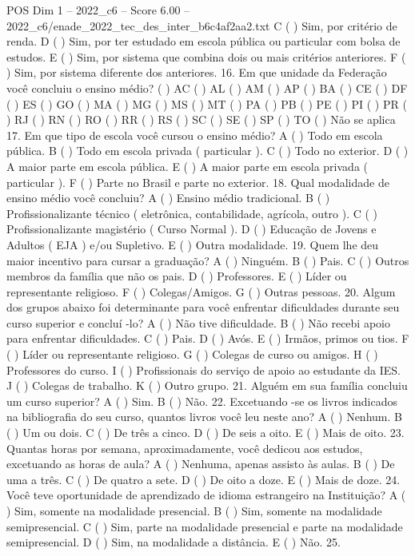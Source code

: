 \begin{textsample}{POS Dim 1 – 2022\_c6 – Score 6.00 – 2022\_c6/enade\_2022\_tec\_des\_inter\_b6c4af2aa2.txt}
C ( ) Sim, por critério de renda.
D ( ) Sim, por ter estudado em escola pública ou particular com bolsa de estudos.
E ( ) Sim, por sistema que combina dois ou mais critérios anteriores.
F ( ) Sim, por sistema diferente dos anteriores. 16.
Em que unidade da Federação você concluiu o ensino médio? ( ) AC ( ) AL ( ) AM ( ) AP ( ) BA ( ) CE ( ) DF ( ) ES ( ) GO ( ) MA ( ) MG ( ) MS ( ) MT ( ) PA ( ) PB ( ) PE ( ) PI ( ) PR ( ) RJ ( ) RN ( ) RO ( ) RR ( ) RS ( ) SC ( ) SE ( ) SP ( ) TO ( ) Não se aplica 17.
Em que tipo de escola você cursou o ensino médio?
A ( ) Todo em escola pública.
B ( ) Todo em escola privada ( particular ).
C ( ) Todo no exterior.
D ( ) A maior parte em escola pública.
E ( ) A maior parte em escola privada ( particular ).
F ( ) Parte no Brasil e parte no exterior. 18.
Qual modalidade de ensino médio você concluiu?
A ( ) Ensino médio tradicional.
B ( ) Profissionalizante técnico ( eletrônica, contabilidade, agrícola, outro ).
C ( ) Profissionalizante magistério ( Curso Normal ).
D ( ) Educação de Jovens e Adultos ( EJA ) e/ou Supletivo.
E ( ) Outra modalidade. 19.
Quem lhe deu maior incentivo para cursar a graduação?
A ( ) Ninguém.
B ( ) Pais.
C ( ) Outros membros da família que não os pais.
D ( ) Professores.
E ( ) Líder ou representante religioso.
F ( ) Colegas/Amigos.
G ( ) Outras pessoas. 20.
Algum dos grupos abaixo foi determinante para você enfrentar dificuldades durante seu curso superior e concluí -lo?
A ( ) Não tive dificuldade.
B ( ) Não recebi apoio para enfrentar dificuldades.
C ( ) Pais.
D ( ) Avós.
E ( ) Irmãos, primos ou tios.
F ( ) Líder ou representante religioso.
G ( ) Colegas de curso ou amigos.
H ( ) Professores do curso.
I ( ) Profissionais do serviço de apoio ao estudante da IES.
J ( ) Colegas de trabalho.
K ( ) Outro grupo. 21.
Alguém em sua família concluiu um curso superior?
A ( ) Sim.
B ( ) Não. 22.
Excetuando -se os livros indicados na bibliografia do seu curso, quantos livros você leu neste ano?
A ( ) Nenhum.
B ( ) Um ou dois.
C ( ) De três a cinco.
D ( ) De seis a oito.
E ( ) Mais de oito. 23.
Quantas horas por semana, aproximadamente, você dedicou aos estudos, excetuando as horas de aula?
A ( ) Nenhuma, apenas assisto às aulas.
B ( ) De uma a três.
C ( ) De quatro a sete.
D ( ) De oito a doze.
E ( ) Mais de doze. 24.
Você teve oportunidade de aprendizado de idioma estrangeiro na Instituição?
A ( ) Sim, somente na modalidade presencial.
B ( ) Sim, somente na modalidade semipresencial.
C ( ) Sim, parte na modalidade presencial e parte na modalidade semipresencial.
D ( ) Sim, na modalidade a distância.
E ( ) Não. 25.

\end{textsample}
